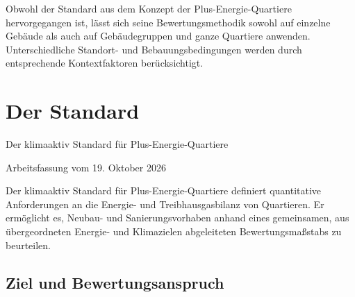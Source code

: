 \documentclass[
  ngerman,
  a4paper,
  DIV=11]{scrreprt}
\begin{document}
\begin{tcolorbox}[enhanced jigsaw, arc=.35mm, bottomrule=.15mm, bottomtitle=1mm, breakable, colback=white, colbacktitle=quarto-callout-note-color!10!white, colframe=quarto-callout-note-color-frame, coltitle=black, left=2mm, leftrule=.75mm, opacityback=0, opacitybacktitle=0.6, rightrule=.15mm, title=\textcolor{quarto-callout-note-color}{\faInfo}\hspace{0.5em}{Gebäude oder Quartier?}, titlerule=0mm, toprule=.15mm, toptitle=1mm]

Obwohl der Standard aus dem Konzept der Plus-Energie-Quartiere
hervorgegangen ist, lässt sich seine Bewertungsmethodik sowohl auf
einzelne Gebäude als auch auf Gebäudegruppen und ganze Quartiere
anwenden. Unterschiedliche Standort- und Bebauungsbedingungen werden
durch entsprechende Kontextfaktoren berücksichtigt.

\end{tcolorbox}


\chapter{Der Standard}\label{sec-standard}

Der klimaaktiv Standard für Plus-Energie-Quartiere

\begin{tcolorbox}[enhanced jigsaw, arc=.35mm, bottomrule=.15mm, breakable, colback=white, colframe=quarto-callout-note-color-frame, left=2mm, leftrule=.75mm, opacityback=0, rightrule=.15mm, toprule=.15mm]
\begin{minipage}[t]{5.5mm}
\textcolor{quarto-callout-note-color}{\faInfo}
\end{minipage}%
\begin{minipage}[t]{\textwidth - 5.5mm}

Arbeitsfassung vom 19. Oktober 2026

\end{minipage}%
\end{tcolorbox}

Der klimaaktiv Standard für Plus-Energie-Quartiere definiert
quantitative Anforderungen an die Energie- und Treibhausgasbilanz von
Quartieren. Er ermöglicht es, Neubau- und Sanierungsvorhaben anhand
eines gemeinsamen, aus übergeordneten Energie- und Klimazielen
abgeleiteten Bewertungsmaßstabs zu beurteilen.

\section{Ziel und Bewertungsanspruch}\label{ziel-und-bewertungsanspruch}
\end{document}
